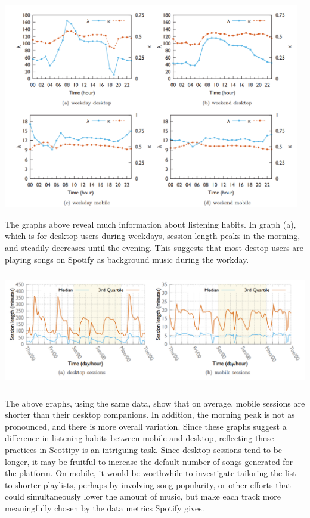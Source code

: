 \includegraphics[height=9cm]{images/length.png}

The graphs above reveal much information about listening habits. In graph (a),
which is for desktop users during weekdays, session length peaks in the morning,
and steadily decreases until the evening. This suggests that most destop users
are playing songs on Spotify as background music during the workday.

\begin{center}\includegraphics[height=5cm]{images/session.png}
\end{center}

The above graphs, using the same data, show that on average, mobile sessions
are shorter than their desktop companions. In addition, the morning peak is not
as pronounced, and there is more overall variation. Since these graphs suggest
a difference in listening habits between mobile and desktop, reflecting these
practices in Scottipy is an intriguing task. Since desktop sessions tend to
be longer, it may be fruitful to increase the default number of songs generated
for the platform. On mobile, it would be worthwhile to investigate tailoring
the list to shorter playlists, perhaps by involving song popularity, or other
efforts that could simultaneously lower the amount of music, but make each track
more meaningfully chosen by the data metrics Spotify gives.

